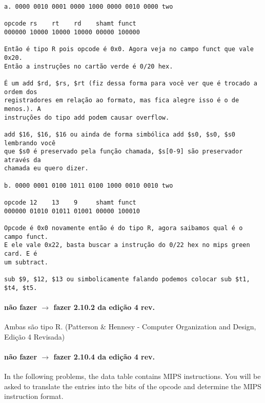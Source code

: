 \documentclass{article}
\begin{document}
\begin{verbatim}
a. 0000 0010 0001 0000 1000 0000 0010 0000 two

opcode rs    rt    rd    shamt funct
000000 10000 10000 10000 00000 100000

Então é tipo R pois opcode é 0x0. Agora veja no campo funct que vale 0x20. 
Então a instruções no cartão verde é 0/20 hex.

É um add $rd, $rs, $rt (fiz dessa forma para você ver que é trocado a ordem dos 
registradores em relação ao formato, mas fica alegre isso é o de menos.). A  
instruções do tipo add podem causar overflow.

add $16, $16, $16 ou ainda de forma simbólica add $s0, $s0, $s0 lembrando você 
que $s0 é preservado pela função chamada, $s[0-9] são preservador através da 
chamada eu quero dizer.

b. 0000 0001 0100 1011 0100 1000 0010 0010 two

opcode 12    13    9     shamt funct
000000 01010 01011 01001 00000 100010

Opcode é 0x0 novamente então é do tipo R, agora saibamos qual é o campo funct. 
E ele vale 0x22, basta buscar a instrução do 0/22 hex no mips green card. E é 
um subtract.

sub $9, $12, $13 ou simbolicamente falando podemos colocar sub $t1, $t4, $t5.
\end{verbatim}

\paragraph{não fazer  $\rightarrow$ fazer 2.10.2 da edição 4 rev.}

Ambas são tipo R. (Patterson \& Hennesy - Computer Organization and Design, 
Edição 4 Revisada)

\paragraph{não fazer  $\rightarrow$ fazer 2.10.4 da edição 4 rev.}

In the following problems, the data table contains MIPS instructions. You will 
be asked to translate the entries into the bits of the opcode and determine the 
MIPS instruction format.
\end{document}

